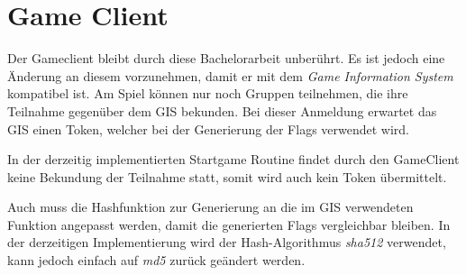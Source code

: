 \section{Game Client} \label{sec:Game_Client}
Der Gameclient bleibt durch diese Bachelorarbeit unberührt. Es ist jedoch eine Änderung an diesem vorzunehmen, damit er mit dem \textit{Game Information System} kompatibel ist.
Am Spiel können nur noch Gruppen teilnehmen, die ihre Teilnahme gegenüber dem GIS bekunden. Bei dieser Anmeldung erwartet das GIS einen Token, welcher bei der Generierung der Flags verwendet wird. 

In der derzeitig implementierten Startgame Routine findet durch den GameClient keine Bekundung der Teilnahme statt, somit wird auch kein Token übermittelt.

Auch muss die Hashfunktion zur Generierung an die im GIS verwendeten Funktion angepasst werden, damit die generierten Flags vergleichbar bleiben. In der derzeitigen Implementierung wird der Hash-Algorithmus \textit{sha512} verwendet, kann jedoch einfach auf \textit{md5} zurück geändert werden.
